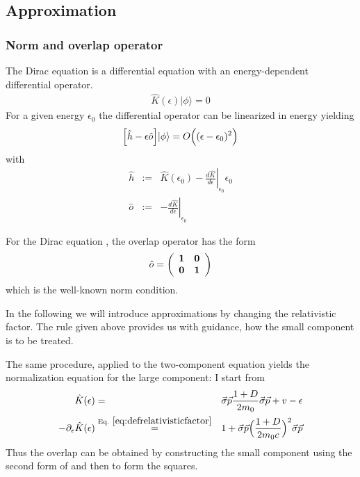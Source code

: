 \documentclass[11pt,a4paper]{report}
\begin{document}
\subsection{Approximation}
\subsubsection{Norm and overlap operator}
The Dirac equation is a differential equation with an energy-dependent
differential operator. 
\begin{eqnarray}
\hat{K}(\epsilon)|\phi\rangle=0
\end{eqnarray}
For a given energy $\epsilon_0$ the differential operator can be
linearized in energy yielding
\begin{eqnarray}
\Bigl[\hat{h}-\epsilon\hat{o}\Bigr]|\phi\rangle
=O\Bigr((\epsilon-\epsilon_0)^2\Bigr)
\end{eqnarray}
with
\begin{eqnarray}
\hat{h}&:=& \hat{K}(\epsilon_0)
-\left.\frac{d\hat{K}}{d\epsilon}\right|_{\epsilon_0}\epsilon_0
\nonumber\\
\hat{o}&:=& -\left.\frac{d\hat{K}}{d\epsilon}\right|_{\epsilon_0}
\end{eqnarray}

For the Dirac equation , the overlap
operator has the form
\begin{eqnarray}
\hat{o}=\left(\begin{array}{cc}\bm{1}&\bm{0}\\
\bm{0}&\bm{1}\end{array}\right)
\end{eqnarray}
which is the well-known norm condition.

In the following we will introduce approximations by changing the
relativistic factor. The rule given above provides us with guidance,
how the small component is to be treated.

The same procedure, applied to the two-component equation yields the
normalization equation for the large component: I start from
\begin{eqnarray}
\hat{K}(\epsilon)&=&
\vec{\sigma}\vec{p} \frac{1+D}{2m_0}
\vec{\sigma}\vec{p} +v-\epsilon
\nonumber\\
-\partial_\epsilon\hat{K}(\epsilon)&\eqrel{eq:defrelativisticfactor}{=}&
1+
\vec{\sigma}\vec{p} \Bigl(\frac{1+D}{2m_0c}\Bigr)^2
\vec{\sigma}\vec{p}
\end{eqnarray}
Thus the overlap can be obtained by constructing the small component
using the second form of  and then to form
the squares.
\end{document}
